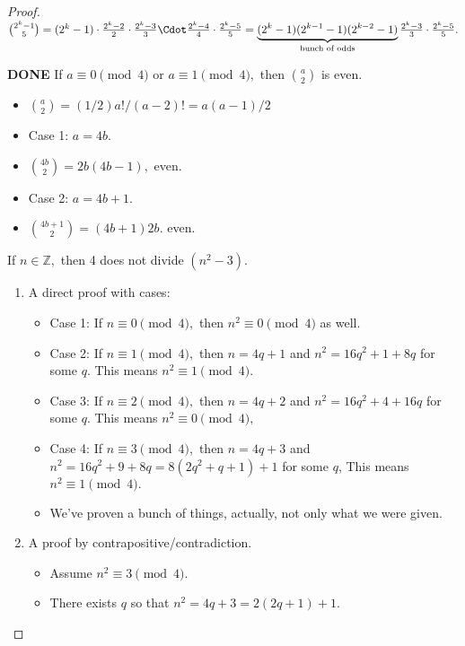 \documentclass[11pt, oneside]{amsart}
\begin{document}
\begin{enumerate}
\begin{proof}
\(\begin{equation*} \binom{2^k-1}{5} = (2^k-1) \cdot \frac{ 2^k-2 }{2} \cdot \frac{ 2^k-3 }{3} \Cdot \frac{ 2^k-4 }{4} \cdot \frac{2^k-5 }{5} \\ = \underbrace{(2^k-1) (2^{k-1}-1) (2^{k-2}-1)}_{\text{bunch of odds}} \frac{ 2^k-3 }{3} \cdot \frac{2^k-5 }{5}.  \end{equation*}\)
\item {\bfseries\sffamily DONE} If \(a \equiv 0 \pmod{4}\) or \(a \equiv 1 \pmod{4},\) then \(\binom{a}{2}\) is even.
\label{sec:org256b45c}
\begin{itemize}
\item \(\binom{a}{2} = (1/2)a!/(a-2)! = a(a-1)/2\)
\item Case 1: \(a=4b\).
\item \(\binom{4b}{2}=2b(4b-1),\) even.
\item Case 2: \(a=4b+1\).
\item \(\binom{4b+1}{2} = (4b+1)2b.\) even.
\end{itemize}
\item If \(n \in \mathbb{Z},\) then 4 does not divide \((n^2-3).\)
\label{sec:orgb582303}
\begin{enumerate}
\item A direct proof with cases:
\label{sec:orga92ee5e}
\begin{itemize}
\item Case 1: If \(n \equiv 0 \pmod{4},\) then \(n^2 \equiv 0 \pmod{4}\) as well.
\item Case 2: If \(n \equiv 1 \pmod{4},\) then \(n = 4q+1\) and \(n^2 = 16q^2 + 1 + 8q\) for some \(q\). This
means \(n^2 \equiv 1 \pmod{4}.\)
\item Case 3: If \(n \equiv 2 \pmod{4},\) then \(n = 4q+2\) and \(n^2 = 16q^2 + 4 + 16q\) for some \(q\).  This
means \(n^2 \equiv 0 \pmod{4},\)
\item Case 4: If \(n \equiv 3 \pmod{4},\) then \(n = 4q+3\) and \(n^2 = 16q^2 + 9 + 8q = 8(2q^2+q+1)+1\) for some
\(q\), This means \(n^2 \equiv 1 \pmod{4}.\)
\item We've proven a bunch of things, actually, not only what we were given.
\end{itemize}
\item A proof by contrapositive/contradiction.
\label{sec:org90b599f}
\begin{itemize}
\item Assume \(n^2 \equiv 3 \pmod{4}\).
\item There exists \(q\) so that \(n^2 = 4q+3 = 2(2q+1)+1\).

\end{itemize}
\end{enumerate}
\end{proof}
\end{enumerate}
\end{document}
